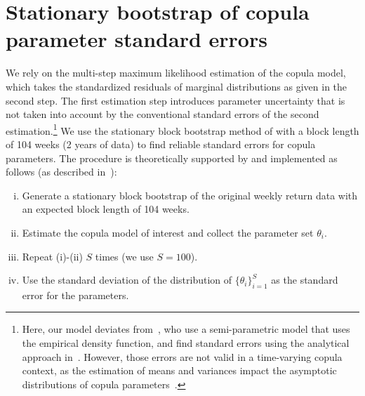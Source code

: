 
\section{Stationary bootstrap of copula parameter standard errors}
\label{App:Appendix_bootstrap}

We rely on the multi-step maximum likelihood estimation of the copula model, which takes the standardized residuals of marginal distributions as given in the second step. The first estimation step introduces parameter uncertainty that is not taken into account by the conventional standard errors of the second estimation.\footnote{Here, our model deviates from~\textcite{ChristoffersenLanglois2013}, who use a semi-parametric model that uses the empirical density function, and find standard errors using the analytical approach in~\textcite{ChenFan2006}. However, those errors are not valid in a time-varying copula context, as the estimation of means and variances impact the asymptotic distributions of copula parameters~\autocite{Remillard2010}.} We use the stationary block bootstrap method of \textcite{PolitisRomano1994} with a block length of 104 weeks (2 years of data) to find reliable standard errors for copula parameters. The procedure is theoretically supported by \textcite{GonclavesWhite2004} and implemented as follows (as described in~\textcite{Patton2012}):
\begin{enumerate}[(i)]
    \item Generate a stationary block bootstrap of the original weekly return data with an expected block length of 104 weeks.
    \item Estimate the copula model of interest and collect the parameter set $\theta_i$.
    \item Repeat (i)-(ii) $S$ times (we use $S = 100$).
    \item Use the standard deviation of the distribution of $\{\theta_i\}_{i=1}^S$ as the standard error for the parameters.
\end{enumerate}
